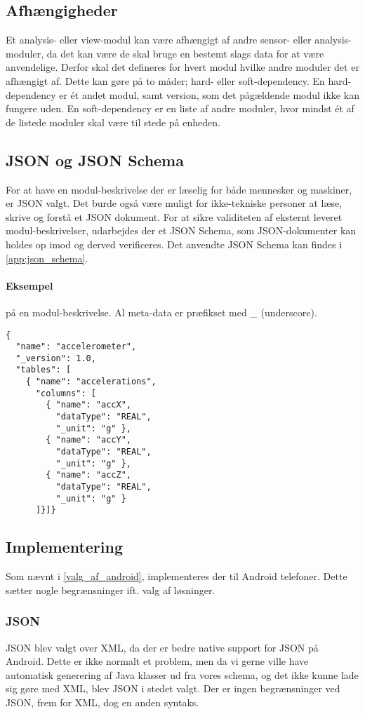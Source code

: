\subsection{Afhængigheder}
Et analysis- eller view-modul kan være afhængigt af andre sensor- eller analysis-moduler, da det kan være de skal bruge en bestemt slags data for at være anvendelige.
Derfor skal det defineres for hvert modul hvilke andre moduler det er afhængigt af.
Dette kan gøre på to måder; hard- eller soft-dependency.
En hard-dependency er ét andet modul, samt version, som det pågældende modul ikke kan fungere uden.
En soft-dependency er en liste af andre moduler, hvor mindst ét af de listede moduler skal være til stede på enheden.

\subsection{JSON og JSON Schema}
For at have en modul-beskrivelse der er læselig for både mennesker og maskiner, er JSON valgt.
Det burde også være muligt for ikke-tekniske personer at læse, skrive og forstå et JSON dokument.
For at sikre validiteten af eksternt leveret modul-beskrivelser, udarbejdes der et JSON Schema, som JSON-dokumenter kan holdes op imod og derved verificeres.
Det anvendte JSON Schema kan findes i \cref{app:json_schema}.

\paragraph{Eksempel} på en modul-beskrivelse.
Al meta-data er præfikset med \_ (underscore).
\begin{lstlisting}
{
  "name": "accelerometer",
  "_version": 1.0,
  "tables": [
    { "name": "accelerations",
      "columns": [
        { "name": "accX",
          "dataType": "REAL",
          "_unit": "g" },
        { "name": "accY",
          "dataType": "REAL",
          "_unit": "g" },
        { "name": "accZ",
          "dataType": "REAL",
          "_unit": "g" }
      ]}]}
\end{lstlisting}

\subsection{Implementering}
Som nævnt i \cref{valg_af_android}, implementeres der til Android telefoner.
Dette sætter nogle begrænsninger ift. valg af løsninger.

\subsubsection{JSON}
JSON blev valgt over XML, da der er bedre native support for JSON på Android.
Dette er ikke normalt et problem, men da vi gerne ville have automatisk generering af Java klasser ud fra vores schema, og det ikke kunne lade sig gøre med XML, blev JSON i stedet valgt.
Der er ingen begrænsninger ved JSON, frem for XML, dog en anden syntaks.


